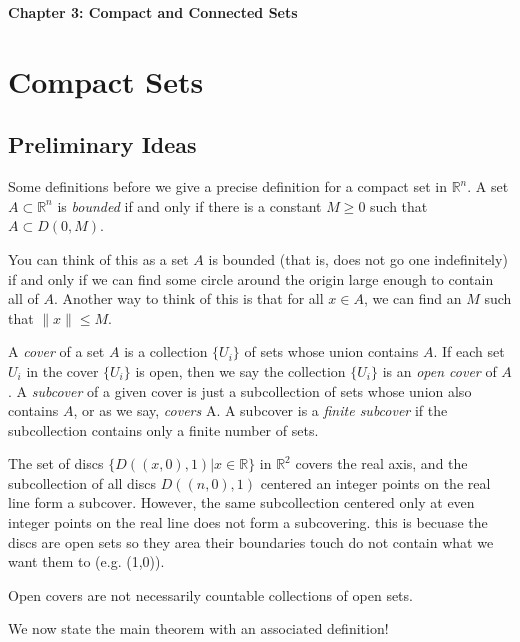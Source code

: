 \documentclass[11pt]{article}
\theoremstyle{definition}
\newcommand{\R}{\mathbb{R}}                      %
\begin{document}
\thispagestyle{empty}

\begin{center}
{\LARGE \bf Chapter 3: Compact and Connected Sets}\\

\end{center}
\section{Compact Sets}
\subsection{Preliminary Ideas}
Some definitions before we give a precise definition for a compact set in $\R^{n}$.
 A set $A\subset \R^n$ is \textit{bounded} if and only if there is a constant $M\geq 0$ such that $A\subset D(0,M)$.

You can think of this as a set $A$ is bounded (that is, does not go one indefinitely) if and only if we can find some circle around the origin large enough to contain all of $A$. Another way to think of this is that for all $x\in A$, we can find an $M$ such that $\|x\|\leq M$.

 A \textit{cover} of a set $A$ is a collection $\{U_i\}$ of sets whose union contains $A$. If each set $U_i$ in the cover $\{U_i\}$ is open, then we say the collection $\{U_i\}$ is an \textit{open cover} of $A$. A \textit{subcover} of a given cover is just a subcollection of sets whose union also contains $A$, or as we say, \textit{covers} A. A subcover is a \textit{finite subcover} if the subcollection contains only a finite number of sets.

\ex The set of discs $\{D((x,0), 1) | x\in\R\}$ in $\R^2$ covers the real axis, and the subcollection of all discs $D((n,0),1)$ centered an integer points on the real line form a subcover. However, the same subcollection centered only at even integer points on the real line does not form a subcovering. this is becuase the discs are open sets so they area their boundaries touch do not contain what we want them to (e.g. (1,0)).

\note Open covers are not necessarily countable collections of open sets.

We now state the main theorem with an associated definition!
\end{document}
